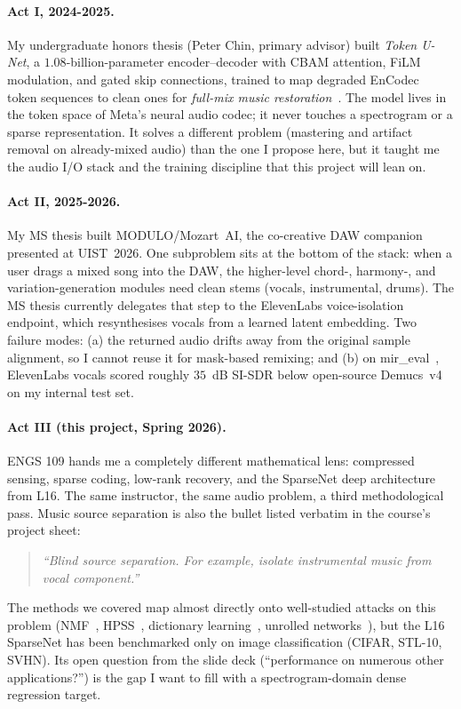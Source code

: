 \documentclass[11pt]{article}
\begin{document}
\paragraph{Act I, 2024-2025.}  My undergraduate honors thesis (Peter Chin,
primary advisor) built \emph{Token U-Net}, a $1.08$-billion-parameter
encoder--decoder with CBAM attention, FiLM modulation, and gated skip
connections, trained to map degraded EnCodec~\cite{encodec} token
sequences to clean ones for \emph{full-mix music
restoration}~\cite{khoo2025tokenunet}.  The model lives in the
token space of Meta's neural audio codec; it never touches a
spectrogram or a sparse representation.  It solves a different
problem (mastering and artifact removal on already-mixed audio) than
the one I propose here, but it taught me the audio I/O stack and the
training discipline that this project will lean on.

\paragraph{Act II, 2025-2026.}  My MS thesis built MODULO/Mozart~AI,
the co-creative DAW companion presented at UIST~2026.  One subproblem
sits at the bottom of the stack: when a user drags a mixed song into
the DAW, the higher-level chord-, harmony-, and
variation-generation modules need clean stems (vocals, instrumental,
drums).  The MS thesis currently delegates that step to the
ElevenLabs voice-isolation endpoint, which resynthesises vocals from
a learned latent embedding.  Two failure modes: (a) the returned
audio drifts away from the original sample alignment, so I cannot
reuse it for mask-based remixing; and (b) on mir\_eval~\cite{mireval},
ElevenLabs vocals scored roughly $35$~dB SI-SDR below open-source
Demucs~v4~\cite{demucs} on my internal test set.

\paragraph{Act III (this project, Spring 2026).}  ENGS 109 hands me a
completely different mathematical lens: compressed sensing, sparse
coding, low-rank recovery, and the SparseNet deep architecture from
L16.  The same instructor, the same audio problem, a third
methodological pass.  Music source separation is also the bullet
listed verbatim in the course's project sheet:
\begin{quote}\itshape
``Blind source separation. For example, isolate instrumental music from
vocal component.''
\end{quote}
The methods we covered map almost directly onto well-studied attacks
on this problem (NMF~\cite{smaragdis2007nmf},
HPSS~\cite{hpss}, dictionary learning~\cite{aharon2006ksvd},
unrolled networks~\cite{gregor2010lista}), but the L16 SparseNet has
been benchmarked only on image classification (CIFAR, STL-10, SVHN).
Its open question from the slide deck (``performance on numerous
other applications?'') is the gap I want to fill with a
spectrogram-domain dense regression target.
\end{document}
